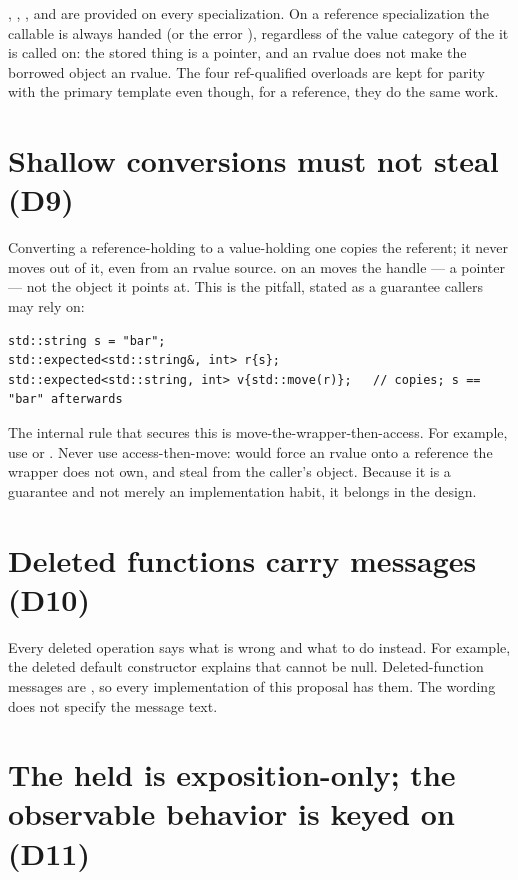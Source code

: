 \documentclass[a4paper,10pt,oneside,openany,final,article]{memoir}
\begin{document}
, , , and
 are provided on every specialization. On a reference
specialization the callable is always handed  (or the error
), regardless of the value category of the  it is
called on: the stored thing is a pointer, and an rvalue  does
not make the borrowed object an rvalue. The four ref-qualified overloads are
kept for parity with the primary template even though, for a reference, they do
the same work.

\section{Shallow conversions must not steal (D9)}

Converting a reference-holding  to a value-holding one copies
the referent; it never moves out of it, even from an rvalue source.
 on an  moves the handle --- a pointer
--- not the object it points at. This is the 
pitfall, stated as a guarantee callers may rely on:

\begin{verbatim}
std::string s = "bar";
std::expected<std::string&, int> r{s};
std::expected<std::string, int> v{std::move(r)};   // copies; s == "bar" afterwards
\end{verbatim}

The internal rule that secures this is move-the-wrapper-then-access. For
example, use  or . Never use
access-then-move:  would force an rvalue onto a reference
the wrapper does not own, and steal from the caller's object. Because it is a
guarantee and not merely an implementation habit, it belongs in the design.

\section{Deleted functions carry messages (D10)}

Every deleted operation says what is wrong and what to do instead. For example,
the deleted default constructor explains that  cannot be null.
Deleted-function messages \cite{P2573R2} are \CppXXVI{}, so every
implementation of this proposal has them. The wording does not specify the
message text.

\section{The held  is exposition-only; the observable
  behavior is keyed on  (D11)}
\end{document}
